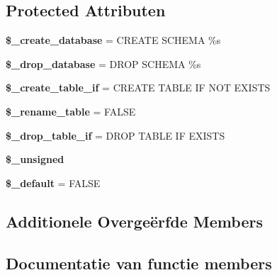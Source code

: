 \subsection*{Protected Attributen}
\begin{DoxyCompactItemize}
\item 
\mbox{\label{class_c_i___d_b__pdo__4d__forge_acd23c9a8735806155f1a5d0a87c151f2}} 
{\bfseries \$\+\_\+create\+\_\+database} = \textquotesingle{}C\+R\+E\+A\+TE S\+C\+H\+E\+MA \%s\textquotesingle{}
\item 
\mbox{\label{class_c_i___d_b__pdo__4d__forge_a8305b12fc17f6f87778260ebdff287b4}} 
{\bfseries \$\+\_\+drop\+\_\+database} = \textquotesingle{}D\+R\+OP S\+C\+H\+E\+MA \%s\textquotesingle{}
\item 
\mbox{\label{class_c_i___d_b__pdo__4d__forge_a2f6484fcb8d1dc3eef67a637227cd583}} 
{\bfseries \$\+\_\+create\+\_\+table\+\_\+if} = \textquotesingle{}C\+R\+E\+A\+TE T\+A\+B\+LE IF N\+OT E\+X\+I\+S\+TS\textquotesingle{}
\item 
\mbox{\label{class_c_i___d_b__pdo__4d__forge_a1a649e7cf9de16bcf932977b18bc91de}} 
{\bfseries \$\+\_\+rename\+\_\+table} = F\+A\+L\+SE
\item 
\mbox{\label{class_c_i___d_b__pdo__4d__forge_a92a8a9145a7fc91e252e58d019373581}} 
{\bfseries \$\+\_\+drop\+\_\+table\+\_\+if} = \textquotesingle{}D\+R\+OP T\+A\+B\+LE IF E\+X\+I\+S\+TS\textquotesingle{}
\item 
{\bfseries \$\+\_\+unsigned}
\item 
\mbox{\label{class_c_i___d_b__pdo__4d__forge_aa119e1b4e3d00f47a7b83b7066087915}} 
{\bfseries \$\+\_\+default} = F\+A\+L\+SE
\end{DoxyCompactItemize}
\subsection*{Additionele Overge\"{e}rfde Members}


\subsection{Documentatie van functie members}
\mbox{\label{class_c_i___d_b__pdo__4d__forge_a41c6cae02f2fda8b429ad0afb9509426}} 

